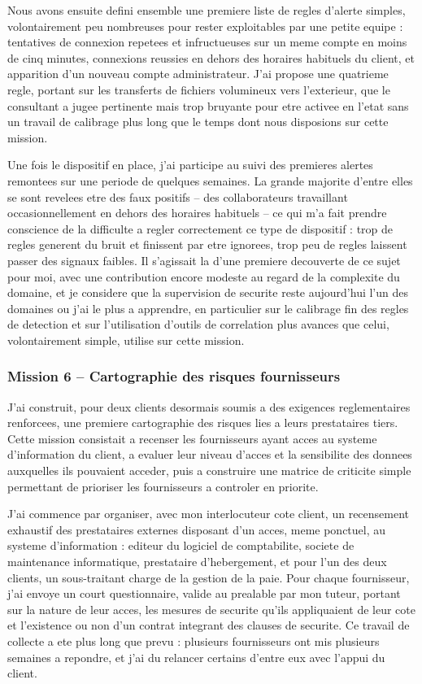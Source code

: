 \documentclass[11pt,a4paper]{article}
\begin{document}
Nous avons ensuite defini ensemble une premiere liste de regles d'alerte simples, volontairement peu nombreuses pour rester exploitables par une petite equipe : tentatives de connexion repetees et infructueuses sur un meme compte en moins de cinq minutes, connexions reussies en dehors des horaires habituels du client, et apparition d'un nouveau compte administrateur. J'ai propose une quatrieme regle, portant sur les transferts de fichiers volumineux vers l'exterieur, que le consultant a jugee pertinente mais trop bruyante pour etre activee en l'etat sans un travail de calibrage plus long que le temps dont nous disposions sur cette mission.

Une fois le dispositif en place, j'ai participe au suivi des premieres alertes remontees sur une periode de quelques semaines. La grande majorite d'entre elles se sont revelees etre des faux positifs -- des collaborateurs travaillant occasionnellement en dehors des horaires habituels -- ce qui m'a fait prendre conscience de la difficulte a regler correctement ce type de dispositif : trop de regles generent du bruit et finissent par etre ignorees, trop peu de regles laissent passer des signaux faibles. Il s'agissait la d'une premiere decouverte de ce sujet pour moi, avec une contribution encore modeste au regard de la complexite du domaine, et je considere que la supervision de securite reste aujourd'hui l'un des domaines ou j'ai le plus a apprendre, en particulier sur le calibrage fin des regles de detection et sur l'utilisation d'outils de correlation plus avances que celui, volontairement simple, utilise sur cette mission.

\subsubsection*{Mission 6 -- Cartographie des risques fournisseurs}

J'ai construit, pour deux clients desormais soumis a des exigences reglementaires renforcees, une premiere cartographie des risques lies a leurs prestataires tiers. Cette mission consistait a recenser les fournisseurs ayant acces au systeme d'information du client, a evaluer leur niveau d'acces et la sensibilite des donnees auxquelles ils pouvaient acceder, puis a construire une matrice de criticite simple permettant de prioriser les fournisseurs a controler en priorite.

J'ai commence par organiser, avec mon interlocuteur cote client, un recensement exhaustif des prestataires externes disposant d'un acces, meme ponctuel, au systeme d'information : editeur du logiciel de comptabilite, societe de maintenance informatique, prestataire d'hebergement, et pour l'un des deux clients, un sous-traitant charge de la gestion de la paie. Pour chaque fournisseur, j'ai envoye un court questionnaire, valide au prealable par mon tuteur, portant sur la nature de leur acces, les mesures de securite qu'ils appliquaient de leur cote et l'existence ou non d'un contrat integrant des clauses de securite. Ce travail de collecte a ete plus long que prevu : plusieurs fournisseurs ont mis plusieurs semaines a repondre, et j'ai du relancer certains d'entre eux avec l'appui du client.
\end{document}
